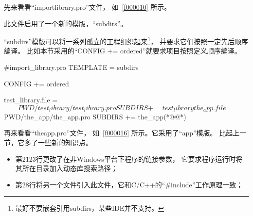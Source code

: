 先来看看“import\underline{\hspace{0.5em}}library.pro”文件，
如\filesourcenumbernameone\ \ref{f000010}
所示。

此文件启用了一个新的模版，“subdirs”。

“subdirs”模版可以将一系列孤立的工程组织起来\footnote{
最好不要嵌套引用subdirs，某些IDE并不支持。
}，
并要求它们按照一定先后顺序编译。
比如本节采用的“CONFIG {\sourcefonttwo{}+}{\sourcefonttwo{}=} ordered”就要求项目按照定义顺序编译。

\label{f000010}    %
\FloatBarrier                                  %
\begin{thebookfilesourceone}[escapeinside={(*@}{@*)},
caption=GoodLuck,
title=\filesourcenumbernameone \thefilesourcenumber
]
#import_library.pro
TEMPLATE = subdirs

CONFIG += ordered

test_library.file = $$PWD/test_library/test_library.pro
SUBDIRS += test_library

the_app.file = $$PWD/the_app/the_app.pro
SUBDIRS += the_app(*@\marginpar[\hfill\setlength\fboxsep{2pt}\fbox{\footnotesize{\kaishu\parbox{1em}{\setlength{\baselineskip}{2pt}\filesourcenumbernameone}}\footnotesize{\thefilesourcenumber}}]{\setlength\fboxsep{2pt}\fbox{\footnotesize{\kaishu\parbox{1em}{\setlength{\baselineskip}{2pt}\filesourcenumbernameone}}\footnotesize{\thefilesourcenumber}}}@*)\end{thebookfilesourceone}          %
\addtocounter{lstlisting}{-1}   %


再来看看“the\underline{\hspace{0.5em}}app.pro”文件，
如\filesourcenumbernameone\ \ref{f000016} 所示。它采用了“app”模版。
比起上一节，它多了一些新的知识点。
\begin{itemize}
\item 第21\raisebox{0.16ex}{\sourcefonttwo\~{}}23行更改了在非Windows平台下程序的链接参数，
它要求程序运行时将其所在目录加入动态库搜索路径；
\item 第28行将另一个文件引入此文件，它和C/C{\sourcefonttwo{}+}{\sourcefonttwo{}+}的“{\sourcefonttwo\#}include”工作原理一致；
\end{itemize}

